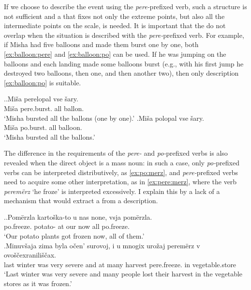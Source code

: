 If we choose to describe the event using the \textit{pere-}prefixed verb, such a structure is not sufficient and a  that fixes not only the extreme points, but also all the intermediate points on the scale, is needed. It is important that the  do not overlap when the situation is described with the \textit{pere-}prefixed verb. For example, if Misha had five balloons and made them burst one by one, both \ref{ex:balloon:pere} and \ref{ex:balloon:po} can be used. If he was jumping on the balloons and each landing made some balloons burst (e.g., with his first jump he destroyed two balloons, then one, and then another two), then only description \ref{ex:balloon:po} is suitable.

\ex.\ag.\label{ex:balloon:pere}Mi\v{s}a perelopal vse \v{s}ary.\\
Mi\v{s}a pere.burst. all ballon.\\
\trans `Misha bursted all the ballons (one by one).'
\bg.\label{ex:balloon:po}Mi\v{s}a polopal vse \v{s}ary.\\
Mi\v{s}a po.burst. all balloon.\\
\trans `Misha bursted all the ballons.'

The difference in the requirements of the \textit{pere-} and \textit{po-}prefixed verbs is also revealed when the direct object is a mass noun: in such a case, only \textit{po-}prefixed verbs can be interpreted distributively, as \ref{ex:po:merz}, and \textit{pere-}prefixed verbs need to acquire some other interpretation, as in \ref{ex:pere:merz}, where the verb \textit{perem\"{e}rz} `he froze' is interpreted excessively. I explain this by a lack of a mechanism that would extract a  from a  description.

\ex.\ag.\label{ex:po:merz}Pom\"{e}rzla karto\v{s}ka-to u nas none, vsja pom\"{e}rzla.\\
po.freeze. potato- at our now all po.freeze.\\
\trans `Our potato plants got frozen now, all of them.'\\
\bg.\label{ex:pere:merz}Minuv\v{s}aja zima byla o\v{c}en' surovoj, i u mnogix uro\v{z}aj perem\"{e}rz v ovo\v{s}\v{c}exranili\v{s}\v{c}ax.\\
last winter was very severe and at many harvest pere.freeze. in vegetable.store\\
\trans `Last winter was very severe and many people lost their harvest in the vegetable stores as it was frozen.'

